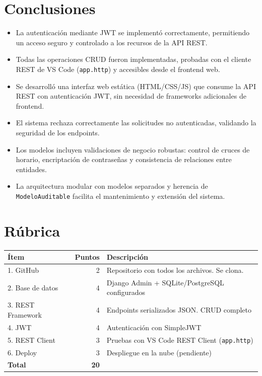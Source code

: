 \documentclass[12pt,a4paper]{article}
\begin{document}
\section{Conclusiones}

\begin{itemize}
    \item La autenticación mediante JWT se implementó correctamente, permitiendo un acceso
          seguro y controlado a los recursos de la API REST.
    \item Todas las operaciones CRUD fueron implementadas, probadas con el cliente REST
          de VS Code (\texttt{app.http}) y accesibles desde el frontend web.
    \item Se desarrolló una interfaz web estática (HTML/CSS/JS) que consume la API REST
          con autenticación JWT, sin necesidad de frameworks adicionales de frontend.
    \item El sistema rechaza correctamente las solicitudes no autenticadas, validando la
          seguridad de los endpoints.
    \item Los modelos incluyen validaciones de negocio robustas: control de cruces de horario,
          encriptación de contraseñas y consistencia de relaciones entre entidades.
    \item La arquitectura modular con modelos separados y herencia de \texttt{ModeloAuditable}
          facilita el mantenimiento y extensión del sistema.
\end{itemize}

\section{Rúbrica}

\begin{longtable}{p{5cm}rp{6cm}}
    \toprule
    \textbf{Ítem} & \textbf{Puntos} & \textbf{Descripción} \\
    \midrule
    \endhead
    1. GitHub & 2 & Repositorio con todos los archivos. Se clona. \\
    2. Base de datos & 4 & Django Admin + SQLite/PostgreSQL configurados \\
    3. REST Framework & 4 & Endpoints serializados JSON. CRUD completo \\
    4. JWT & 4 & Autenticación con SimpleJWT \\
    5. REST Client & 3 & Pruebas con VS Code REST Client (\texttt{app.http}) \\
    6. Deploy & 3 & Despliegue en la nube (pendiente) \\
    \midrule
    \textbf{Total} & \textbf{20} & \\
    \bottomrule
\end{longtable}
\end{document}

